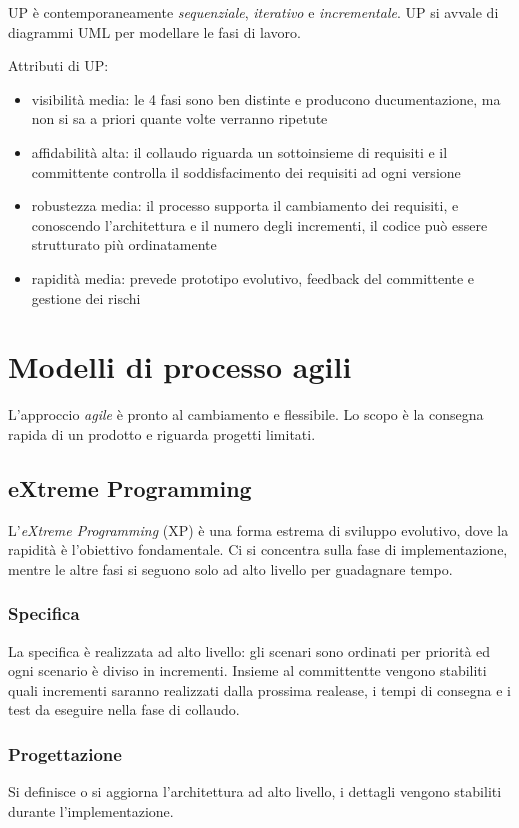 \documentclass[11pt]{article}
\begin{document}
UP è contemporaneamente \textit{sequenziale}, \textit{iterativo} e \textit{incrementale}. UP si avvale di diagrammi UML 
per modellare le fasi di lavoro.

Attributi di UP:
\begin{itemize}
    \item visibilità media: le 4 fasi sono ben distinte e producono ducumentazione, ma non si sa a priori quante volte 
    verranno ripetute
    \item affidabilità alta: il collaudo riguarda un sottoinsieme di requisiti e il committente controlla il soddisfacimento 
    dei requisiti ad ogni versione 
    \item robustezza media: il processo supporta il cambiamento dei requisiti, e conoscendo l'architettura e il numero 
    degli incrementi, il codice può essere strutturato più ordinatamente
    \item rapidità media: prevede prototipo evolutivo, feedback del committente e gestione dei rischi
\end{itemize}
\section{Modelli di processo agili}
L'approccio \textit{agile} è pronto al cambiamento e flessibile. Lo scopo è la consegna rapida di un prodotto e riguarda
progetti limitati.
\subsection{eXtreme Programming}
L'\textit{eXtreme Programming} (XP) è una forma estrema di sviluppo evolutivo, dove la rapidità è l'obiettivo fondamentale.
Ci si concentra sulla fase di implementazione, mentre le altre fasi si seguono solo ad alto livello per guadagnare tempo.
\subsubsection*{Specifica}
La specifica è realizzata ad alto livello: gli scenari sono ordinati per priorità ed ogni scenario è diviso in incrementi.
Insieme al committentte vengono stabiliti quali incrementi saranno realizzati dalla prossima realease, i tempi di consegna 
e i test da eseguire nella fase di collaudo.
\subsubsection*{Progettazione}
Si definisce o si aggiorna l'architettura ad alto livello, i dettagli vengono stabiliti durante l'implementazione.
\end{document}
